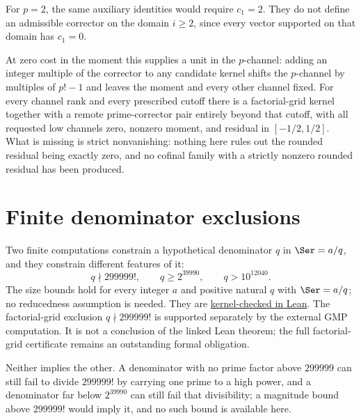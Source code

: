 For $p=2$, the same auxiliary identities would require $c_1=2$.  They do
not define an admissible corrector on the domain $i\ge2$, since every vector
supported on that domain has $c_1=0$.

\noindent At zero cost in the moment this supplies a unit in the
$p$-channel: adding an integer multiple of the corrector to any candidate
kernel shifts the $p$-channel by multiples of $p!-1$ and leaves the moment
and every other channel fixed.  For every channel rank and every prescribed
cutoff there is a factorial-grid kernel together with a remote prime-corrector
pair entirely beyond that cutoff, with all requested low channels zero,
nonzero moment, and residual in $[-1/2,1/2]$.  What is missing is strict
nonvanishing: nothing here rules out the rounded residual being exactly zero,
and no cofinal family with a strictly nonzero rounded residual has been
produced.

\section{Finite denominator exclusions}\label{long68:sec:finite}
\label{long68:res:lead-denominator-exclusions}

Two finite computations constrain a hypothetical denominator $q$ in
$\Ser=a/q$, and they constrain different features of it:
\begin{equation}\label{long68:eq:finite-bounds}
 q\nmid299999!,\qquad q\ge2^{39990},\qquad q>10^{12040}.
\end{equation}
The size bounds hold for every integer $a$ and positive natural $q$ with
$\Ser=a/q$; no reducedness assumption is needed. They are
\href{https://github.com/wcook04/plectis-erdos/blob/25ef6245d15a47548c6926369ae8f1a0f0a14a80/ErdosProblems/Erdos68/PaperCompleteFiniteSizeCertificate.lean#L58}{kernel-checked in Lean}.
The factorial-grid exclusion $q\nmid299999!$ is supported separately by the
external GMP computation. It is not a conclusion of the linked Lean theorem;
the full factorial-grid certificate remains an outstanding formal obligation.

Neither implies the other.  A denominator with no prime factor above
$299999$ can still fail to divide $299999!$ by carrying one prime to a high
power, and a denominator far below $2^{39990}$ can still fail that
divisibility; a magnitude bound above $299999!$ would imply it, and no such
bound is available here.

